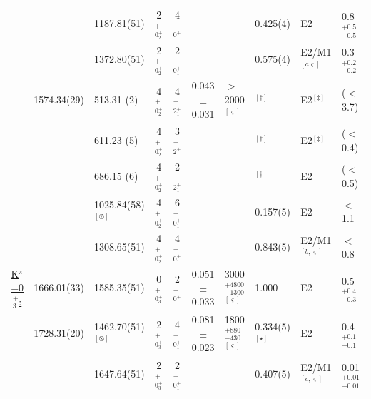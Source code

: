 \begin{landscape}
\begin{center}
\begin{longtable}{cllcccllll}
                                &              & 1187.81(51)                & 2$^+_{0^+_2}$    & 4$^+_{0^+_1}$ &&                                                     & 0.425(4)       & E2                & 0.8$^{+0.5}_{-0.5}$                         \\
                                &              & 1372.80(51)                & 2$^+_{0^+_2}$    & 2$^+_{0^+_1}$ &&                                                     & 0.575(4)       & E2/M1$^{[a\varsigma]}$& 0.3$^{+0.2}_{-0.2}$ \\  
                                & 1574.34(29)  & 513.31 (2)                 & 4$^+_{0^+_2}$    & 4$^+_{2^+_1}$ &0.043$\pm$0.031& $>$2000$^{[\varsigma]}$                  & $^{[\dagger]}$ & E2$^{[\ddagger]}$ & ($<$3.7) \\
                                &              & 611.23 (5)                 & 4$^+_{0^+_2}$    & 3$^+_{2^+_1}$ &&                                                     & $^{[\dagger]}$ & E2$^{[\ddagger]}$ & ($<$0.4) \\
                                &              & 686.15 (6)                 & 4$^+_{0^+_2}$    & 2$^+_{2^+_1}$ &&                                                     & $^{[\dagger]}$ & E2                & ($<$0.5) \\
                                &              & 1025.84(58)$^{[\oslash]}$  & 4$^+_{0^+_2}$    & 6$^+_{0^+_1}$ &&                                                     & 0.157(5)       & E2                & $<$1.1   \\
                                &              & 1308.65(51)                & 4$^+_{0^+_2}$    & 4$^+_{0^+_1}$ &&                                                     & 0.843(5)       & E2/M1$^{[b,\varsigma]}$& $<$0.8   \\          \hline
\underline{K$^\pi$=0$^+_3$:}    & 1666.01(33)  & 1585.35(51)                & 0$^+_{0^+_3}$    & 2$^+_{0^+_1}$ &0.051$\pm$0.033 & 3000$^{+4800}_{-1300}$ $^{[\varsigma]}$ & 1.000          & E2                & 0.5$^{+0.4}_{-0.3}$   \\
                                & 1728.31(20)  & 1462.70(51)$^{[\otimes]}$ & 2$^+_{0^+_3}$    & 4$^+_{0^+_1}$ &0.081$\pm$0.023& 1800$^{+880}_{-430}$ $^{[\varsigma]}$    &0.334(5)$^{[\star]}$ & E2           & 0.4$^{+0.1}_{-0.1}$ \\   
                                &              & 1647.64(51)                & 2$^+_{0^+_3}$    & 2$^+_{0^+_1}$ &&                                                     &0.407(5)        & E2/M1$^{[c,\varsigma]}$& 0.01$^{+0.01}_{-0.01}$ \\   

\end{longtable}
\end{center}
\end{landscape}
